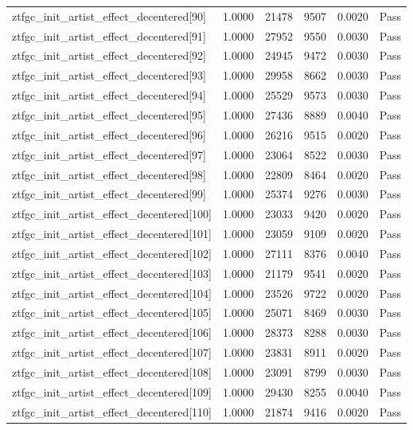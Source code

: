 \begin{table}[htbp]
\begin{tabular}{llrrll}
ztfgc\_init\_artist\_effect\_decentered[90] & 1.0000 & 21478 & 9507 & 0.0020 & Pass \\
ztfgc\_init\_artist\_effect\_decentered[91] & 1.0000 & 27952 & 9550 & 0.0030 & Pass \\
ztfgc\_init\_artist\_effect\_decentered[92] & 1.0000 & 24945 & 9472 & 0.0030 & Pass \\
ztfgc\_init\_artist\_effect\_decentered[93] & 1.0000 & 29958 & 8662 & 0.0030 & Pass \\
ztfgc\_init\_artist\_effect\_decentered[94] & 1.0000 & 25529 & 9573 & 0.0030 & Pass \\
ztfgc\_init\_artist\_effect\_decentered[95] & 1.0000 & 27436 & 8889 & 0.0040 & Pass \\
ztfgc\_init\_artist\_effect\_decentered[96] & 1.0000 & 26216 & 9515 & 0.0020 & Pass \\
ztfgc\_init\_artist\_effect\_decentered[97] & 1.0000 & 23064 & 8522 & 0.0030 & Pass \\
ztfgc\_init\_artist\_effect\_decentered[98] & 1.0000 & 22809 & 8464 & 0.0020 & Pass \\
ztfgc\_init\_artist\_effect\_decentered[99] & 1.0000 & 25374 & 9276 & 0.0030 & Pass \\
ztfgc\_init\_artist\_effect\_decentered[100] & 1.0000 & 23033 & 9420 & 0.0020 & Pass \\
ztfgc\_init\_artist\_effect\_decentered[101] & 1.0000 & 23059 & 9109 & 0.0020 & Pass \\
ztfgc\_init\_artist\_effect\_decentered[102] & 1.0000 & 27111 & 8376 & 0.0040 & Pass \\
ztfgc\_init\_artist\_effect\_decentered[103] & 1.0000 & 21179 & 9541 & 0.0020 & Pass \\
ztfgc\_init\_artist\_effect\_decentered[104] & 1.0000 & 23526 & 9722 & 0.0020 & Pass \\
ztfgc\_init\_artist\_effect\_decentered[105] & 1.0000 & 25071 & 8469 & 0.0030 & Pass \\
ztfgc\_init\_artist\_effect\_decentered[106] & 1.0000 & 28373 & 8288 & 0.0030 & Pass \\
ztfgc\_init\_artist\_effect\_decentered[107] & 1.0000 & 23831 & 8911 & 0.0020 & Pass \\
ztfgc\_init\_artist\_effect\_decentered[108] & 1.0000 & 23091 & 8799 & 0.0030 & Pass \\
ztfgc\_init\_artist\_effect\_decentered[109] & 1.0000 & 29430 & 8255 & 0.0040 & Pass \\
ztfgc\_init\_artist\_effect\_decentered[110] & 1.0000 & 21874 & 9416 & 0.0020 & Pass \\

\end{tabular}
\end{table}
